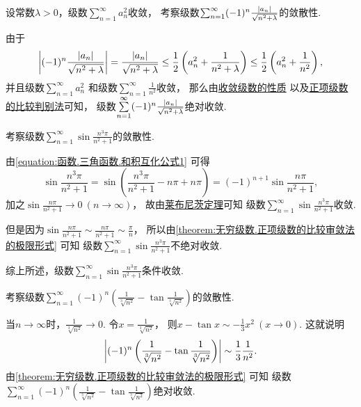 \begin{example}
设常数\(\lambda>0\)，级数\(\sum_{n=1}^\infty a_n^2\)收敛，
考察级数\(\sum_{n=1}^\infty (-1)^n \frac{\abs{a_n}}{\sqrt{n^2+\lambda}}\)的敛散性.
\begin{solution}
由于\begin{equation*}
	\abs{(-1)^n \frac{\abs{a_n}}{\sqrt{n^2+\lambda}}}
	= \frac{\abs{a_n}}{\sqrt{n^2+\lambda}}
	\leq \frac{1}{2} \left( a_n^2 + \frac{1}{n^2+\lambda} \right)
	\leq \frac{1}{2} \left( a_n^2 + \frac{1}{n^2} \right),
\end{equation*}
并且级数\(\sum\limits_{n=1}^\infty a_n^2\)
和级数\(\sum\limits_{n=1}^\infty \frac{1}{n^2}\)收敛，
那么由\hyperref[theorem:无穷级数.收敛级数性质2]{收敛级数的性质}%
以及\hyperref[theorem:无穷级数.正项级数的比较审敛法的推论]{正项级数的比较判别法}可知，
级数\(\sum\limits_{n=1}^\infty (-1)^n \frac{\abs{a_n}}{\sqrt{n^2+\lambda}}\)绝对收敛.
\end{solution}
\end{example}
\begin{example}
考察级数\(\sum_{n=1}^\infty \sin\frac{n^3\pi}{n^2+1}\)的敛散性.
\begin{solution}
由\cref{equation:函数.三角函数.和积互化公式1} 可得\begin{equation*}
	\sin\frac{n^3\pi}{n^2+1}
	= \sin\left( \frac{n^3\pi}{n^2+1} - n\pi + n\pi \right)
	= (-1)^{n+1} \sin\frac{n\pi}{n^2+1},
\end{equation*}
加之\(\sin\frac{n\pi}{n^2+1}\to0\ (n\to\infty)\)，
故由\hyperref[theorem:无穷级数.莱布尼茨定理]{莱布尼茨定理}可知
级数\(\sum_{n=1}^\infty \sin\frac{n^3\pi}{n^2+1}\)收敛.

但是因为\(\sin\frac{n\pi}{n^2+1}
\sim \frac{n\pi}{n^2+1}
\sim \frac\pi{n}\)，
所以由\cref{theorem:无穷级数.正项级数的比较审敛法的极限形式} 可知
级数\(\sum_{n=1}^\infty \sin\frac{n^3\pi}{n^2+1}\)不绝对收敛.

综上所述，级数\(\sum_{n=1}^\infty \sin\frac{n^3\pi}{n^2+1}\)条件收敛.
\end{solution}
\end{example}
\begin{example}
考察级数\(\sum_{n=1}^\infty (-1)^n \left( \frac1{\sqrt[3]{n^2}} - \tan\frac1{\sqrt[3]{n^2}} \right)\)的敛散性.
\begin{solution}
当\(n\to\infty\)时，\(\frac1{\sqrt[3]{n^2}}\to0\).
令\(x=\frac1{\sqrt[3]{n^2}}\)，
则\(x - \tan x \sim -\frac13 x^2\ (x\to0)\).
这就说明\begin{equation*}
	\abs{(-1)^n \left( \frac1{\sqrt[3]{n^2}} - \tan\frac1{\sqrt[3]{n^2}} \right)} \sim \frac13 \frac1{n^2}.
\end{equation*}
由\cref{theorem:无穷级数.正项级数的比较审敛法的极限形式} 可知
级数\(\sum_{n=1}^\infty (-1)^n \left( \frac1{\sqrt[3]{n^2}} - \tan\frac1{\sqrt[3]{n^2}} \right)\)绝对收敛.
\end{solution}
\end{example}

